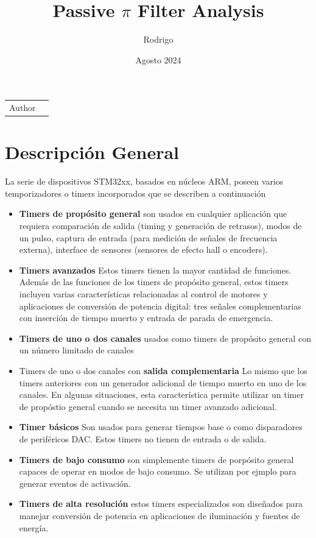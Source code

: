 \documentclass{article}
\title{Passive $\pi$ Filter Analysis}
\author{Rodrigo}
\date{Agosto 2024}
\begin{document}
	
	\maketitle
	
	\noindent\begin{tabular}{@{}ll}
		Author & \theauthor\\

	\end{tabular}

	
	\section{Descripción General}
	La serie de dispositivos STM32xx, basados en núcleos ARM, poseen varios temporizadores o timers incorporados que se describen a continuación
	
	\begin{itemize}
		\item \textbf{Timers de propósito general} son usados en cualquier aplicación que requiera comparación de salida (timing y generación de retrasos), modos de un pulso, captura de entrada (para medición de señales de frecuencia externa), interface de sensores (sensores de efecto hall o encoders).
		\item \textbf{Timers avanzados} Estos timers tienen la mayor cantidad de funciones. Además de las funciones de los timers de propósito general, estos timers incluyen varias características relacionadas al control de motores y aplicaciones de conversión de potencia digital: tres señales complementarias con inserción de tiempo muerto y entrada de parada de emergencia.
		\item \textbf{Timers de uno o dos canales} usados como timers de propósito general con un número limitado de canales
		\item Timers de uno o dos canales con \textbf{salida complementaria} Lo mismo que los timers anteriores con un generador adicional de tiempo muerto en uno de los canales. En algunas situaciones, esta característica permite utilizar un timer de propóstio general cuando se necesita un timer avanzado adicional.
		\item \textbf{Timer básicos} Son usados para generar tiempos base o como disparadores de periféricos DAC. Estos timers no tienen de entrada o de salida.
		\item \textbf{Timers de bajo consumo} son simplemente timers de porpósito general capaces de operar en modos de bajo consumo. Se utilizan por ejmplo para generar eventos de activación.
		\item \textbf{Timers de alta resolución} estos timers especializados son diseñados para manejar conversión de potencia en aplicaciones de iluminación y fuentes de energía.
	\end{itemize}
\end{document}
